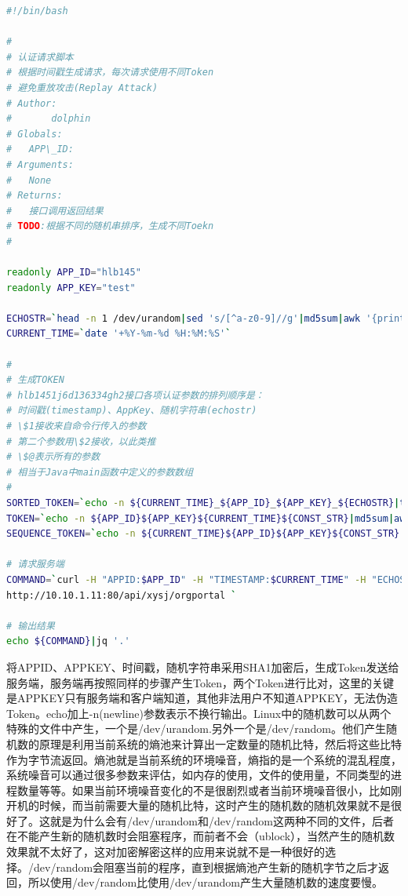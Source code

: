 \documentclass[12pt]{book}
\numberwithin{dummy}{section}
\theoremstyle{ocrenumbox}
\theoremstyle{blacknumex}
\theoremstyle{blacknumbox}
\theoremstyle{ocrenum}
\begin{document}
\begin{lstlisting}[language=Bash]
#!/bin/bash

#
# 认证请求脚本
# 根据时间戳生成请求，每次请求使用不同Token
# 避免重放攻击(Replay Attack)
# Author:
# 		dolphin
# Globals:
#   APP\_ID:
# Arguments:
#   None
# Returns:
#   接口调用返回结果
# TODO:根据不同的随机串排序，生成不同Toekn
#

readonly APP_ID="hlb145"
readonly APP_KEY="test"

ECHOSTR=`head -n 1 /dev/urandom|sed 's/[^a-z0-9]//g'|md5sum|awk '{print $1}'`
CURRENT_TIME=`date '+%Y-%m-%d %H:%M:%S'`

#
# 生成TOKEN
# hlb1451j6d136334gh2接口各项认证参数的排列顺序是：
# 时间戳(timestamp)、AppKey、随机字符串(echostr)
# \$1接收来自命令行传入的参数
# 第二个参数用\$2接收，以此类推
# \$@表示所有的参数
# 相当于Java中main函数中定义的参数数组
#
SORTED_TOKEN=`echo -n ${CURRENT_TIME}_${APP_ID}_${APP_KEY}_${ECHOSTR}|tr '_' '\t'|sort|tr -d '\011'`
TOKEN=`echo -n ${APP_ID}${APP_KEY}${CURRENT_TIME}${CONST_STR}|md5sum|awk '{print $1}'`
SEQUENCE_TOKEN=`echo -n ${CURRENT_TIME}${APP_ID}${APP_KEY}${CONST_STR}|shasum -a 1|awk '{print $1}'`

# 请求服务端
COMMAND=`curl -H "APPID:$APP_ID" -H "TIMESTAMP:$CURRENT_TIME" -H "ECHOSTR:$CONST_STR" -H "TOKEN:$SEQUENCE_TOKEN" \
http://10.10.1.11:80/api/xysj/orgportal `

# 输出结果
echo ${COMMAND}|jq '.'
\end{lstlisting}

将APPID、APPKEY、时间戳，随机字符串采用SHA1加密后，生成Token发送给服务端，服务端再按照同样的步骤产生Token，两个Token进行比对，这里的关键是APPKEY只有服务端和客户端知道，其他非法用户不知道APPKEY，无法伪造Token。echo加上-n(newline)参数表示不换行输出。Linux中的随机数可以从两个特殊的文件中产生，一个是/dev/urandom.另外一个是/dev/random。他们产生随机数的原理是利用当前系统的熵池来计算出一定数量的随机比特，然后将这些比特作为字节流返回。熵池就是当前系统的环境噪音，熵指的是一个系统的混乱程度，系统噪音可以通过很多参数来评估，如内存的使用，文件的使用量，不同类型的进程数量等等。如果当前环境噪音变化的不是很剧烈或者当前环境噪音很小，比如刚开机的时候，而当前需要大量的随机比特，这时产生的随机数的随机效果就不是很好了。这就是为什么会有/dev/urandom和/dev/random这两种不同的文件，后者在不能产生新的随机数时会阻塞程序，而前者不会（ublock），当然产生的随机数效果就不太好了，这对加密解密这样的应用来说就不是一种很好的选择。/dev/random会阻塞当前的程序，直到根据熵池产生新的随机字节之后才返回，所以使用/dev/random比使用/dev/urandom产生大量随机数的速度要慢。
\end{document}
